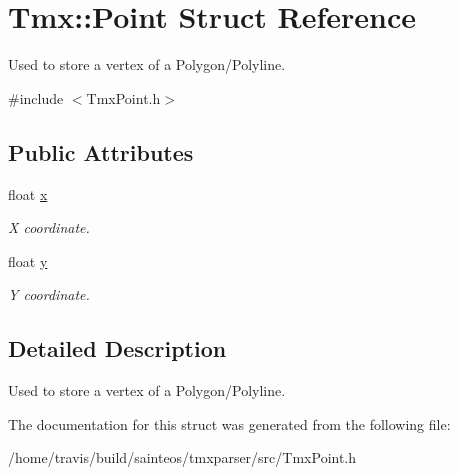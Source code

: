 \hypertarget{structTmx_1_1Point}{\section{Tmx\-:\-:Point Struct Reference}
\label{structTmx_1_1Point}
}


Used to store a vertex of a Polygon/\-Polyline.  




{\ttfamily \#include $<$Tmx\-Point.\-h$>$}

\subsection*{Public Attributes}
\begin{DoxyCompactItemize}
\item 
\hypertarget{structTmx_1_1Point_ab819a07e71c9685306d92b0173fc137c}{float \hyperlink{structTmx_1_1Point_ab819a07e71c9685306d92b0173fc137c}{x}}\label{structTmx_1_1Point_ab819a07e71c9685306d92b0173fc137c}

\begin{DoxyCompactList}\small\item\em X coordinate. \end{DoxyCompactList}\item 
\hypertarget{structTmx_1_1Point_af9ce4e615f66858dcf77f1d2026510ba}{float \hyperlink{structTmx_1_1Point_af9ce4e615f66858dcf77f1d2026510ba}{y}}\label{structTmx_1_1Point_af9ce4e615f66858dcf77f1d2026510ba}

\begin{DoxyCompactList}\small\item\em Y coordinate. \end{DoxyCompactList}\end{DoxyCompactItemize}


\subsection{Detailed Description}
Used to store a vertex of a Polygon/\-Polyline. 

The documentation for this struct was generated from the following file\-:\begin{DoxyCompactItemize}
\item 
/home/travis/build/sainteos/tmxparser/src/Tmx\-Point.\-h\end{DoxyCompactItemize}
